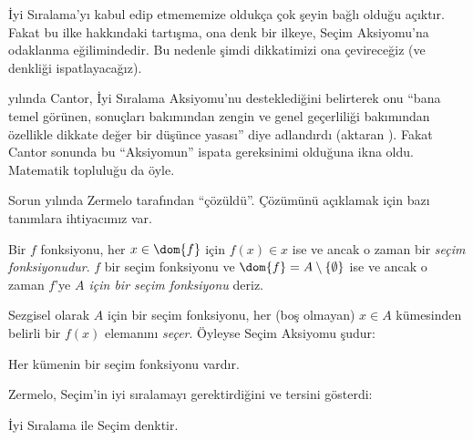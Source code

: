 \documentclass[../../../include/open-logic-section]{subfiles}
\begin{document}

İyi Sıralama'yı kabul edip etmememize oldukça çok şeyin bağlı olduğu
açıktır. Fakat bu ilke hakkındaki tartışma, ona denk bir ilkeye, Seçim
Aksiyomu'na odaklanma eğilimindedir. Bu nedenle şimdi dikkatimizi ona
çevireceğiz (ve denkliği ispatlayacağız).

\citeyear{Cantor1883} yılında Cantor, İyi Sıralama Aksiyomu'nu
desteklediğini belirterek onu ``bana temel görünen, sonuçları bakımından
zengin ve genel geçerliliği bakımından özellikle dikkate değer bir düşünce
yasası'' diye adlandırdı (aktaran \citeauthor{Potter2004}
\citeyear[p.~243]{Potter2004}). Fakat Cantor sonunda bu ``Aksiyomun''
ispata gereksinimi olduğuna ikna oldu. Matematik topluluğu da öyle.

Sorun \citeyear{Zermelo1904} yılında Zermelo tarafından ``çözüldü''.
Çözümünü açıklamak için bazı tanımlara ihtiyacımız var.

\begin{defn}
Bir $f$ fonksiyonu, her $x\in\dom{f}$ için $f(x)\in x$ ise ve ancak o
zaman bir \emph{seçim fonksiyonudur}. $f$ bir seçim fonksiyonu ve
$\dom{f}=A\setminus\{\emptyset\}$ ise ve ancak o zaman $f$'ye
\emph{$A$ için bir seçim fonksiyonu} deriz.
\end{defn}

Sezgisel olarak $A$ için bir seçim fonksiyonu, her (boş olmayan)
$x\in A$ kümesinden belirli bir $f(x)$ elemanını \emph{seçer}. Öyleyse
Seçim Aksiyomu şudur:

\begin{axiom}[Seçim]
	Her kümenin bir seçim fonksiyonu vardır.
\end{axiom}

Zermelo, Seçim'in iyi sıralamayı gerektirdiğini ve tersini gösterdi:

\begin{thm}[$\ZF$ içinde]
İyi Sıralama ile Seçim denktir.
\end{thm}
\end{document}
